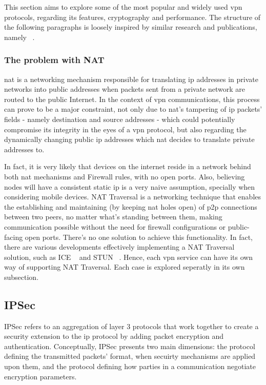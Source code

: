 \documentclass[11pt,twoside,a4paper]{report}
\begin{document}
This section aims to explore some of the most popular and widely used \ac{vpn} protocols, regarding its features, cryptography and performance. The structure of the following paragraphs is loosely inspired by similar research and publications, namely ~\cite{zuqueteseguranca}.

\subsubsection{The problem with NAT}

\ac{nat} is a networking mechanism responsible for translating \ac{ip} addresses in private networks into public addresses when packets sent from a private network are routed to the public Internet. In the context of \ac{vpn} communications, this process can prove to be a major constraint, not only due to \ac{nat}'s tampering of \ac{ip} packets' fields - namely destination and source addresses - which could potentially compromise its integrity in the eyes of a \ac{vpn} protocol, but also regarding the dynamically changing public \ac{ip} addresses which \ac{nat} decides to translate private addresses to.

In fact, it is very likely that devices on the internet reside in a network behind both \ac{nat} mechanisms and Firewall rules, with no open ports. Also, believing nodes will have a consistent static \ac{ip} is a very naive assumption, specially when considering mobile devices. NAT Traversal is a networking technique that enables the establishing and maintaining (by keeping \ac{nat} holes open) of \ac{p2p} connections between two peers, no matter what's standing between them, making communication possible without the need for firewall configurations or public-facing open ports. There's no one solution to achieve this functionality. In fact, there are various developments effectively implementing a NAT Traversal solution, such as ICE ~\cite{rfc8445} and STUN ~\cite{rfc8489}. Hence, each \ac{vpn} service can have its own way of supporting NAT Traversal. Each case is explored seperatly in its own subsection.

\subsection{IPSec}

IPSec refers to an aggregation of layer 3 protocols that work together to create a security extension to the \ac{ip} protocol by adding packet encryption and authentication. Conceptually, IPSec presents two main dimensions: the protocol defining the transmitted packets' format, when secuirty mechanisms are applied upon them, and the protocol defining how parties in a communication negotiate encryption parameters.
\end{document}

